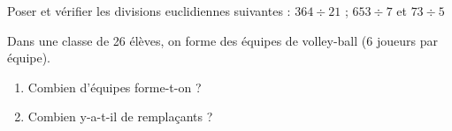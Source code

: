 \begin{myexs}
	Poser et vérifier les divisions euclidiennes suivantes : $364 \div 21$ ; $653 \div 7$ et $73 \div 5$
	
	\vspace*{4cm} 
\end{myexs}

\begin{mypb}
	Dans une classe de 26 élèves, on forme des équipes de volley-ball (6 joueurs par équipe).
	
	\begin{enumerate}
		\item Combien d’équipes forme-t-on ?
		\item Combien y-a-t-il de remplaçants ?	
	\end{enumerate}

\vspace*{5cm} 	
\end{mypb}